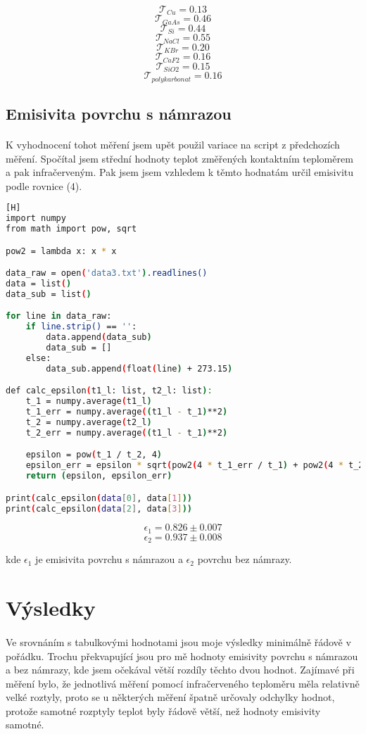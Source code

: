 \documentclass[a4paper,11pt]{article}
\newcommand{\Tau}{\mathcal{T}}
\begin{document}
        $$ \Tau_{Cu} = 0.13 $$
        $$ \Tau_{GaAs} = 0.46 $$
        $$ \Tau_{Si} = 0.44 $$
        $$ \Tau_{NaCl} = 0.55 $$
        $$ \Tau_{KBr} = 0.20 $$
        $$ \Tau_{CaF2} = 0.16 $$
        $$ \Tau_{SiO2} = 0.15 $$
        $$ \Tau_{polykarbonat} = 0.16 $$

    \subsection{Emisivita povrchu s námrazou}

        \paragraph{} K vyhodnocení tohot měření jsem upět použil variace na script
        z předchozích měření. Spočítal jsem střední hodnoty teplot změřených kontaktním
        teploměrem a pak infračerveným. Pak jsem jsem vzhledem k těmto hodnatám určil 
        emisivitu podle rovnice (4).

\begin{lstlisting}[language=Bash][H]
import numpy
from math import pow, sqrt

pow2 = lambda x: x * x

data_raw = open('data3.txt').readlines()
data = list()
data_sub = list()

for line in data_raw:
    if line.strip() == '':
        data.append(data_sub)
        data_sub = []
    else:
        data_sub.append(float(line) + 273.15)

def calc_epsilon(t1_l: list, t2_l: list):
    t_1 = numpy.average(t1_l)
    t_1_err = numpy.average((t1_l - t_1)**2)
    t_2 = numpy.average(t2_l)
    t_2_err = numpy.average((t1_l - t_1)**2)

    epsilon = pow(t_1 / t_2, 4)
    epsilon_err = epsilon * sqrt(pow2(4 * t_1_err / t_1) + pow2(4 * t_2_err / t_2))
    return (epsilon, epsilon_err)

print(calc_epsilon(data[0], data[1]))
print(calc_epsilon(data[2], data[3]))\end{lstlisting}

    $$ \epsilon_{1} = 0.826 \pm 0.007 $$
    $$ \epsilon_{2} = 0.937 \pm 0.008 $$

    kde $\epsilon_{1}$ je emisivita povrchu s námrazou a $\epsilon_{2}$ 
    povrchu bez námrazy.

\section{Výsledky}

    \paragraph{} Ve srovnáním s tabulkovými hodnotami jsou moje výsledky minimálně řádově
    v pořádku. Trochu překvapující jsou pro mě hodnoty emisivity povrchu s námrazou a bez
    námrazy, kde jsem očekával větší rozdíly těchto dvou hodnot. Zajímavé při měření bylo,
    že jednotlivá měření pomocí infračerveného teploměru měla relativně velké roztyly, proto
    se u některých měření špatně určovaly odchylky hodnot, protože samotné rozptyly teplot byly
    řádově větší, než hodnoty emisivity samotné.
    
\end{document}
